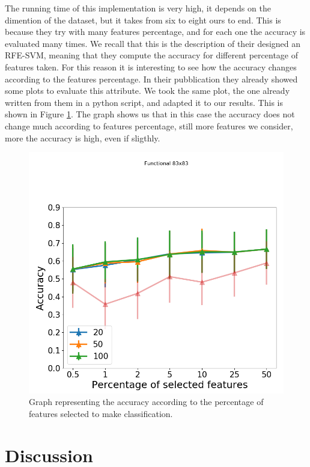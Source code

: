 The running time of this implementation is very high, it depends on the dimention of the dataset, but it takes from six to eight ours to end. This is because they try with many features percentage, and for each one the accuracy is evaluated many times. We recall that this is the description of their designed an RFE-SVM, meaning that they compute the accuracy for different percentage of features taken. For this reason it is interesting to see how the accuracy changes according to the features percentage. In their pubblication they already showed some plots to evaluate this attribute. We took the same plot, the one already written from them in a python script, and adapted it to our results. This is shown in Figure \ref{fig:diagram20}. The graph shows us that in this case the accuracy does not change much according to features percentage, still more features we consider, more the accuracy is high, even if sligthly. 

\begin{figure}[htbp]
	\centering
	\includegraphics[scale=0.5]{Immagini/fc_83_schizo.png}
	\caption{Graph representing the accuracy according to the percentage of features selected to make classification.}
	\label{fig:diagram20}
\end{figure}

\newpage
\section{Discussion}


